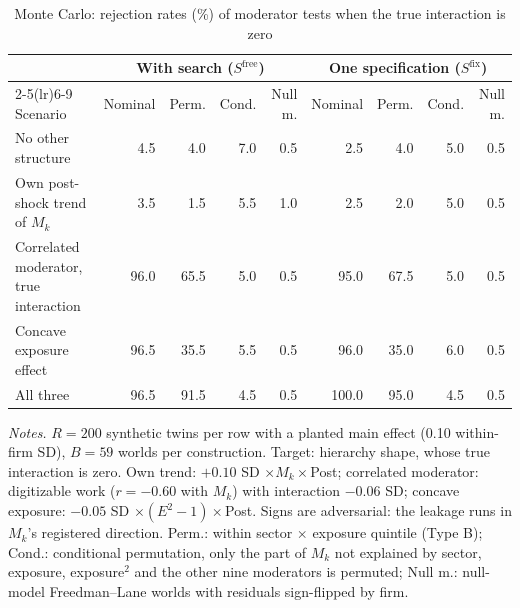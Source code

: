 \begin{table}[!htbp]\centering\footnotesize
\caption{Monte Carlo: rejection rates (\%) of moderator tests when the true interaction is zero}\label{tab:v_modmc}
\setlength{\tabcolsep}{4.5pt}\begin{tabular}{lrrrrrrrr}
\toprule
 & \multicolumn{4}{c}{With search ($S^{\text{free}}$)} & \multicolumn{4}{c}{One specification ($S^{\text{fix}}$)} \\
\cmidrule(lr){2-5}\cmidrule(lr){6-9}
Scenario & Nominal & Perm. & Cond. & Null m. & Nominal & Perm. & Cond. & Null m. \\
\midrule
No other structure & 4.5 & 4.0 & 7.0 & 0.5 & 2.5 & 4.0 & 5.0 & 0.5 \\
Own post-shock trend of $M_k$ & 3.5 & 1.5 & 5.5 & 1.0 & 2.5 & 2.0 & 5.0 & 0.5 \\
Correlated moderator, true interaction & 96.0 & 65.5 & 5.0 & 0.5 & 95.0 & 67.5 & 5.0 & 0.5 \\
Concave exposure effect & 96.5 & 35.5 & 5.5 & 0.5 & 96.0 & 35.0 & 6.0 & 0.5 \\
All three & 96.5 & 91.5 & 4.5 & 0.5 & 100.0 & 95.0 & 4.5 & 0.5 \\
\bottomrule
\end{tabular}
\begin{minipage}{0.97\linewidth}\vspace{2pt}\scriptsize\textit{Notes.} $R=200$ synthetic twins per row with a planted main effect (0.10 within-firm SD), $B=59$ worlds per construction. Target: hierarchy shape, whose true interaction is zero. Own trend: $+0.10$ SD $\times M_k\times$Post; correlated moderator: digitizable work ($r=-0.60$ with $M_k$) with interaction $-0.06$ SD; concave exposure: $-0.05$ SD $\times(E^2-1)\times$Post. Signs are adversarial: the leakage runs in $M_k$'s registered direction. Perm.: within sector $\times$ exposure quintile (Type B); Cond.: conditional permutation, only the part of $M_k$ not explained by sector, exposure, exposure$^2$ and the other nine moderators is permuted; Null m.: null-model Freedman--Lane worlds with residuals sign-flipped by firm.\end{minipage}
\end{table}